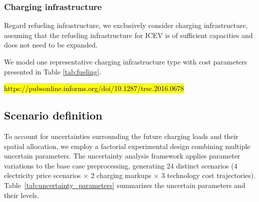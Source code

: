\documentclass[preprint,10pt,review, authoryear]{elsarticle}
\begin{document}
    \subsubsection{Charging infrastructure}
            Regard refueling infrastructure, we exclusively consider charging infrastructure, assuming that the refueling infrastructure for ICEV is of sufficient capacities and does not need to be expanded. 

            We model one representative charging infrastructure type with cost parameters presented in Table \ref{tab:fueling}.
            
            \hl{https://pubsonline.informs.org/doi/10.1287/trsc.2016.0678} \\
    \begin{table}[H]
            \centering
            \caption{Assumptions of parameters related to the deployment of fueling infrastructure.}
            \label{tab:fueling}
            \end{table}

    \subsection{Scenario definition}
        To account for uncertainties surrounding the future charging loads and their spatial allocation, we employ a factorial experimental design combining multiple uncertain parameters. The uncertainty analysis framework applies parameter variations to the base case preprocessing, generating 24 distinct scenarios (4 electricity price scenarios $\times$ 2 charging markups $\times$ 3 technology cost trajectories). Table~\ref{tab:uncertainty_parameters} summarizes the uncertain parameters and their levels.
\end{document}
